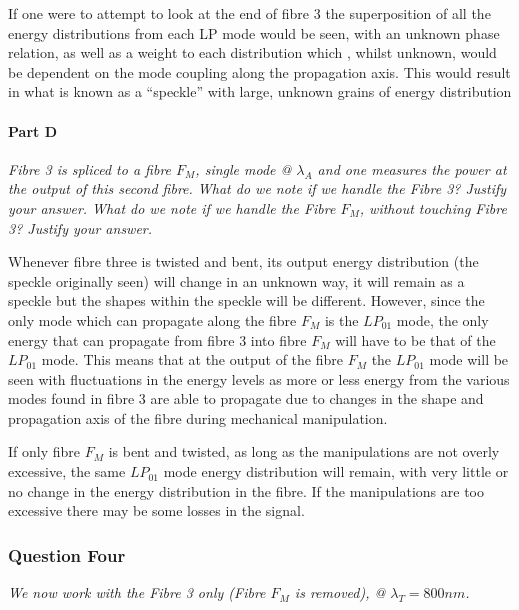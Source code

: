 \documentclass[colorlinks,11pt,a4paper,normalphoto,withhyper,ragged2e]{altareport}
\begin{document}
If one were to attempt to look at the end of fibre 3 the superposition of all the energy distributions from each LP mode would be seen, with an unknown phase relation, as well as a weight to each distribution which , whilst unknown, would be dependent on the mode coupling along the propagation axis. This would result in what is known as a ``speckle'' with large, unknown grains of energy distribution



\paragraph{Part D \linebreak}
\textit{Fibre 3 is spliced to a fibre $F_M$, single mode @ $\lambda_A$ and one measures the power at the output of this second fibre. What do we note if we handle the Fibre 3? Justify your answer. What do we note if we handle the Fibre $F_M$, without touching Fibre 3? Justify your answer.} \linebreak

Whenever fibre three is twisted and bent, its output energy distribution (the speckle originally seen) will change in an unknown way, it will remain as a speckle but the shapes within the speckle will be different. However, since the only mode which can propagate along the fibre $F_{M}$ is the $LP_{01}$ mode, the only energy that can propagate from fibre 3 into fibre $F_{M}$ will have to be that of the $LP_{01}$ mode. This means that at the output of the fibre $F_{M}$ the $LP_{01}$ mode will be seen with fluctuations in the energy levels as more or less energy from the various modes found in fibre 3 are able to propagate due to changes in the shape and propagation axis of the fibre during mechanical manipulation. \linebreak

If only fibre $F_{M}$ is bent and twisted, as long as the manipulations are not overly excessive, the same $LP_{01}$ mode energy distribution will remain, with very little or no change in the energy distribution in the fibre. If the manipulations are too excessive there may be some losses in the signal.


\newpage




\subsubsection{Question Four}
\textit{We now work with the Fibre 3 only (Fibre $F_M$ is removed), @ $\lambda_T = 800nm$.}
\end{document}
